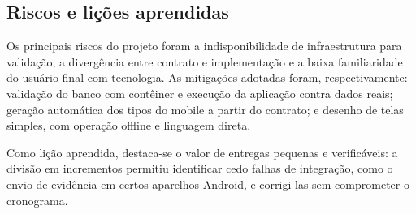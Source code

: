\subsection{Riscos e lições aprendidas}

Os principais riscos do projeto foram a indisponibilidade de infraestrutura para
validação, a divergência entre contrato e implementação e a baixa familiaridade
do usuário final com tecnologia. As mitigações adotadas foram, respectivamente:
validação do banco com contêiner e execução da aplicação contra dados reais;
geração automática dos tipos do mobile a partir do contrato; e desenho de telas
simples, com operação offline e linguagem direta.

Como lição aprendida, destaca-se o valor de entregas pequenas e verificáveis: a
divisão em incrementos permitiu identificar cedo falhas de integração, como o
envio de evidência em certos aparelhos Android, e corrigi-las sem comprometer o
cronograma.
